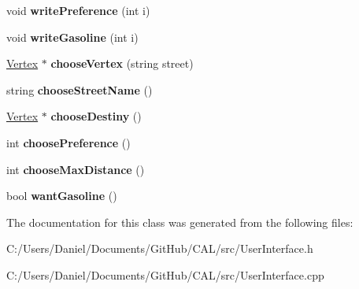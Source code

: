 \begin{DoxyCompactItemize}
void {\bfseries write\+Preference} (int i)
\item 
\hypertarget{class_user_interface_ac8eed556fd7e3e9219beba647a7c1ea0}{}\label{class_user_interface_ac8eed556fd7e3e9219beba647a7c1ea0} 
void {\bfseries write\+Gasoline} (int i)
\item 
\hypertarget{class_user_interface_ade977702479731a04b4a04b07fd6918e}{}\label{class_user_interface_ade977702479731a04b4a04b07fd6918e} 
\hyperlink{class_vertex}{Vertex} $\ast$ {\bfseries choose\+Vertex} (string street)
\item 
\hypertarget{class_user_interface_aa4de83bd61b0f2fb99f728b1e58b3fbc}{}\label{class_user_interface_aa4de83bd61b0f2fb99f728b1e58b3fbc} 
string {\bfseries choose\+Street\+Name} ()
\item 
\hypertarget{class_user_interface_a8d63136fbf03e2517cd4815e00f7b86d}{}\label{class_user_interface_a8d63136fbf03e2517cd4815e00f7b86d} 
\hyperlink{class_vertex}{Vertex} $\ast$ {\bfseries choose\+Destiny} ()
\item 
\hypertarget{class_user_interface_ab73f29a7be054e832b9c980130d0eade}{}\label{class_user_interface_ab73f29a7be054e832b9c980130d0eade} 
int {\bfseries choose\+Preference} ()
\item 
\hypertarget{class_user_interface_a86506b83f6a3b483aa74f50f52fe99f3}{}\label{class_user_interface_a86506b83f6a3b483aa74f50f52fe99f3} 
int {\bfseries choose\+Max\+Distance} ()
\item 
\hypertarget{class_user_interface_a4218e3246374f32226cee7481804f5e2}{}\label{class_user_interface_a4218e3246374f32226cee7481804f5e2} 
bool {\bfseries want\+Gasoline} ()
\end{DoxyCompactItemize}


The documentation for this class was generated from the following files\+:\begin{DoxyCompactItemize}
\item 
C\+:/\+Users/\+Daniel/\+Documents/\+Git\+Hub/\+C\+A\+L/src/User\+Interface.\+h\item 
C\+:/\+Users/\+Daniel/\+Documents/\+Git\+Hub/\+C\+A\+L/src/User\+Interface.\+cpp\end{DoxyCompactItemize}
